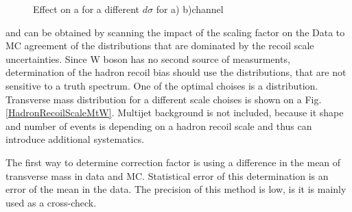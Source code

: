\begin{figure}[h]
\begin{minipage}[h]{0.49\linewidth}
\end{minipage}
\hfill
\begin{minipage}[h]{0.49\linewidth}
\end{minipage}
\vfill
\begin{minipage}[h]{0.49\linewidth}
\end{minipage}
\hfill
\begin{minipage}[h]{0.49\linewidth}
\end{minipage}
\vfill
\begin{minipage}[h]{0.49\linewidth}
\end{minipage}
\hfill
\begin{minipage}[h]{0.49\linewidth}
\end{minipage}
\caption{Effect on a \cw for a different $d\sigma$ for a) \wenu b)\wmunu channel}
\label{ris:Cw}
\end{figure}
and can be obtained by scanning the impact of the scaling factor on the Data to MC agreement of the distributions that are dominated by the recoil scale uncertainties. Since W boson has no second source of \ptw measurments, determination of the hadron recoil bias should use the distributions, that  are not sensitive to a truth \ptw spectrum.  One of the optimal choises is a \mtw distribution. Transverse mass distribution for a different scale choises is shown on a Fig. \ref{HadronRecoilScaleMtW}. Multijet background is not included, because it shape and number of events is depending on a hadron recoil scale and thus can introduce additional systematics.

The first way to determine correction factor is using a difference in the mean of transverse mass in data and MC. Statistical error of this determination is an error of the mean in the data. The precision of this method is low, is it is mainly used as a cross-check. 

